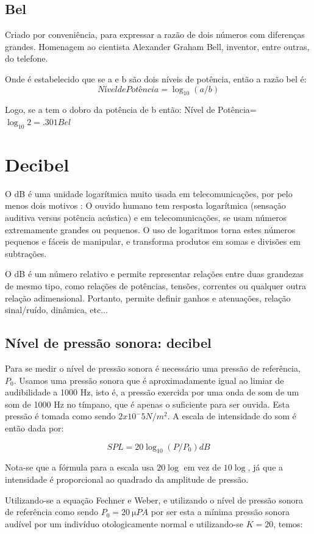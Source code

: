 \documentclass[
	article,			%
	11pt,				%
	oneside,			%
	a4paper,			%
	english,			%
	brazil,				%
	sumario=tradicional
	]{abntex2}
\begin{document}
\subsection{Bel}

Criado por conveniência, para expressar a razão de dois números com diferenças grandes. Homenagem ao cientista Alexander Graham Bell, inventor, entre outras, do telefone.

Onde é estabelecido que se a e b são dois níveis de potência, então a razão bel é: 
$$Nível de Potência = \log_{10} (a/b)$$

Logo, se a tem o dobro da potência de b então:
Nível de Potência= $\log_{10} 2 = .301 Bel$

\section{Decibel}

O dB é uma unidade logarítmica muito usada em telecomunicações, por pelo menos dois motivos : O ouvido humano tem resposta logarítmica (sensação auditiva versus potência acústica) e em telecomunicações, se usam números extremamente grandes ou pequenos. O uso de logaritmos torna estes números pequenos e fáceis de manipular, e transforma produtos em somas e divisões em subtrações.

O dB é um número relativo e permite representar relações entre duas grandezas de mesmo tipo, como relações de potências, tensões, correntes ou qualquer outra relação adimensional.
Portanto, permite definir ganhos e atenuações, relação sinal/ruído, dinâmica, etc...

\subsection{Nível de pressão sonora: decibel}
Para se medir o nível de pressão sonora é necessário uma pressão de referência, $P_0$. Usamos uma pressão sonora que é aproximadamente igual ao limiar de audibilidade a 1000 Hz, isto é, a pressão exercida por uma onda de som de um som de 1000 Hz no tímpano, que é apenas o suficiente para ser ouvida. Esta pressão é tomada como sendo $2 x 10^-5 N/m^2$. A escala de intensidade do som é então dada por:

$$SPL = 20 \log_{10}(P/P_0) dB$$

Nota-se que a fórmula para a escala usa $20 \log$ em vez de $10 \log$, já que a intensidade é proporcional ao quadrado da amplitude de pressão.

Utilizando-se a equação Fechner e Weber, e utilizando o nível de pressão sonora de referência como sendo $P_0 = \SI{20}{\micro}PA$ por ser esta a mínima pressão sonora audível por um indivíduo otologicamente normal e utilizando-se $K=20$, temos:
\end{document}
